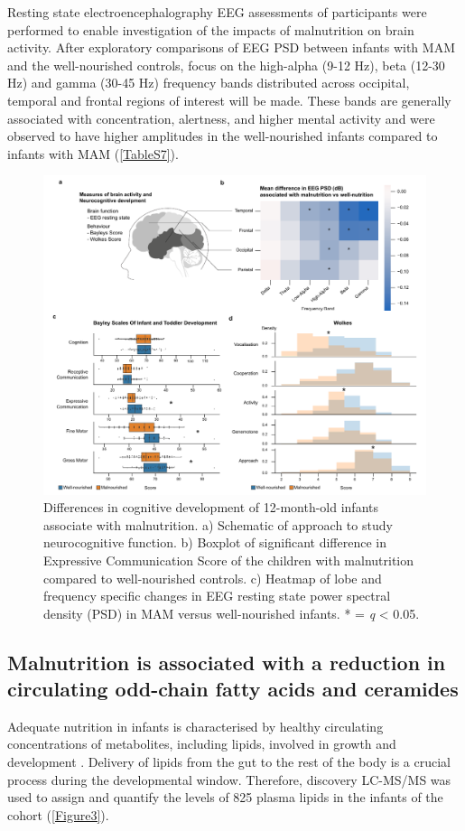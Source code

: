 \documentclass{article}
\begin{document}
Resting state electroencephalography \gls{EEG} assessments of participants were performed to enable investigation of the impacts of malnutrition on brain activity.
After exploratory comparisons of \gls{EEG} \gls{PSD} between infants with \gls{MAM} and the well-nourished controls, focus on the high-alpha (9-12 Hz), beta (12-30 Hz) and gamma (30-45 Hz) frequency bands distributed across occipital, temporal and frontal regions of interest will be made.
These bands are generally associated with concentration, alertness, and higher mental activity and were observed to have higher amplitudes in the well-nourished infants compared to infants with \gls{MAM} (\autoref{TableS7}).

\begin{figure}[!htb]
\centering
\includegraphics[scale=1.4]{../../figures/Figure2-brain.pdf}
\caption[Differences in cognitive development of 12-month-old infants associate with malnutrition]{
	Differences in cognitive development of 12-month-old infants associate with malnutrition.
	a) Schematic of approach to study neurocognitive function.
	b) Boxplot of significant difference in Expressive Communication Score of the children with malnutrition compared to well-nourished controls.
	c) Heatmap of lobe and frequency specific changes in EEG resting state power spectral density (PSD) in \gls{MAM} versus well-nourished infants. * = \textit{q} \textless{} 0.05.}
\label{Figure2}
\end{figure}

\subsection*{Malnutrition is associated with a reduction in circulating odd-chain fatty acids and ceramides}
Adequate nutrition in infants is characterised by healthy circulating concentrations of metabolites, including lipids, involved in growth and development \cite{badaloo2006lipid}.
Delivery of lipids from the gut to the rest of the body is a crucial process during the developmental window.
Therefore, discovery LC-MS/MS was used to assign and quantify the levels of 825 plasma lipids in the infants of the cohort (\autoref{Figure3}).
\end{document}

